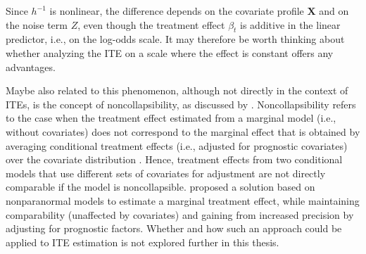 Since $h^{-1}$ is nonlinear, the difference depends on the covariate profile $\mathbf{X}$ and on the noise term $Z$, even though the treatment effect $\beta_t$ is additive in the linear predictor, i.e., on the log-odds scale. It may therefore be worth thinking about whether analyzing the ITE on a scale where the effect is constant offers any advantages.

\medskip


Maybe also related to this phenomenon, although not directly in the context of ITEs, is the concept of noncollapsibility, as discussed by \citet{dandl2025}. Noncollapsibility refers to the case when the treatment effect estimated from a marginal model (i.e., without covariates) does not correspond to the marginal effect that is obtained by averaging conditional treatment effects (i.e., adjusted for prognostic covariates) over the covariate distribution \citet{aalen2015}. Hence, treatment effects from two conditional models that use different sets of covariates for adjustment are not directly comparable if the model is noncollapsible. \citet{dandl2025} proposed a solution based on nonparanormal models \citep{liu2009, klein2022} to estimate a marginal treatment effect, while maintaining comparability (unaffected by covariates) and gaining from increased precision by adjusting for prognostic factors. Whether and how such an approach could be applied to ITE estimation is not explored further in this thesis.



